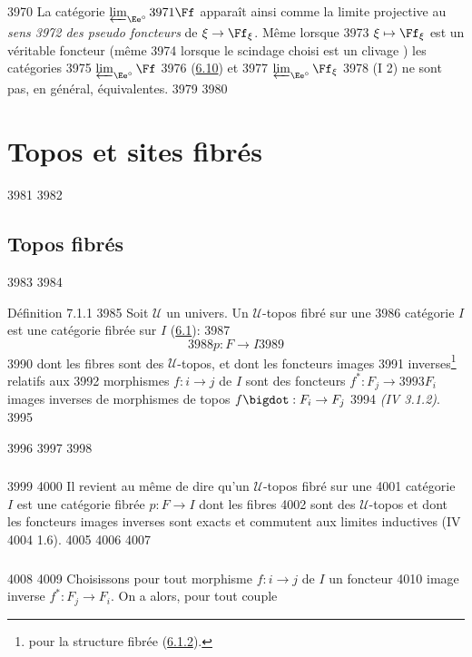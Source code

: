   3970	La catégorie $\varprojlim_{\Ee^{\circ}}
  3971	\Ff$ apparaît ainsi comme la limite projective au \emph{sens
  3972	  des pseudo foncteurs} de $\xi \to \Ff_{\xi}$. Même lorsque
  3973	$\xi \mapsto \Ff_{\xi}$ est un véritable foncteur (\ie même
  3974	lorsque le scindage choisi est un clivage \cite{5}) les catégories
  3975	$\varprojlim_{\Ee^{\circ}}\Ff$
  3976	(\hyperref[VI.subsec6.10]{6.10}) et
  3977	$\varprojlim_{\Ee^{\circ}}\Ff_{\xi}$
  3978	(I 2) ne sont pas, en général, équivalentes.
  3979	
  3980	\section{Topos et sites fibrés}
  3981	
  3982	\subsection{Topos fibrés}
  3983	
  3984	\begin{enonce*}{Définition 7.1.1}
  3985	Soit $𝒰$ un univers. Un $𝒰$-topos fibré sur une
  3986	catégorie $I$ est une catégorie fibrée sur $I$ (\hyperref[VI.def6.1]{6.1}):
  3987	$$
  3988	p : F \to I
  3989	$$
  3990	dont les fibres sont des $𝒰$-topos, et dont les foncteurs images
  3991	inverses\footnote{pour la structure fibrée (\hyperref[VI.subsubsec6.1.2]{6.1.2}).} relatifs aux
  3992	morphismes $f : i \to j$ de $I$ sont des foncteurs $f^{\ast} : F_j \to
  3993	F_i$ images inverses de morphismes de topos $f\bigdot : F_i \to F_j$
  3994	\emph{(IV 3.1.2)}.
  3995	\end{enonce*}
  3996	
  3997	\setcounter{subsubsection}{1}
  3998	\subsubsection{}
  3999	
  4000	Il revient au même de dire qu'un $𝒰$-topos fibré sur une
  4001	catégorie $I$ est une catégorie fibrée $p : F \to I$ dont les fibres
  4002	sont des $𝒰$-topos et dont les foncteurs	images inverses sont exacts et commutent aux limites inductives (IV
  4004	1.6).
  4005	
  4006	
  4007	\subsubsection{}
  4008	
  4009	Choisissons pour tout morphisme $f : i \to j$ de $I$ un foncteur
  4010	image inverse $f^{\ast} : F_j \to F_i$. On a alors, pour tout couple
